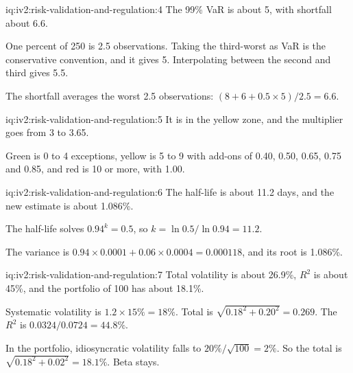 \begin{solution}{iq:iv2:risk-validation-and-regulation:4}
The 99\% VaR is about 5, with shortfall about 6.6.

One percent of 250 is 2.5 observations. Taking the third-worst as VaR is the conservative convention, and it gives 5. Interpolating between the second and third gives 5.5.

The shortfall averages the worst 2.5 observations: $(8 + 6 + 0.5 \times 5)/2.5 = 6.6$.

\end{solution}

\begin{solution}{iq:iv2:risk-validation-and-regulation:5}
It is in the yellow zone, and the multiplier goes from 3 to 3.65.

Green is 0 to 4 exceptions, yellow is 5 to 9 with add-ons of 0.40, 0.50, 0.65, 0.75 and 0.85, and red is 10 or more, with 1.00.

\end{solution}

\begin{solution}{iq:iv2:risk-validation-and-regulation:6}
The half-life is about 11.2 days, and the new estimate is about 1.086\%.

The half-life solves $0.94^k = 0.5$, so $k = \ln 0.5/\ln 0.94 = 11.2$.

The variance is $0.94 \times 0.0001 + 0.06 \times 0.0004 = 0.000118$, and its root is 1.086\%.

\end{solution}

\begin{solution}{iq:iv2:risk-validation-and-regulation:7}
Total volatility is about 26.9\%, $R^2$ is about 45\%, and the portfolio of 100 has about 18.1\%.

Systematic volatility is $1.2 \times 15\% = 18\%$. Total is $\sqrt{0.18^2 + 0.20^2} = 0.269$. The $R^2$ is $0.0324/0.0724 = 44.8\%$.

In the portfolio, idiosyncratic volatility falls to $20\%/\sqrt{100} = 2\%$. So the total is $\sqrt{0.18^2 + 0.02^2} = 18.1\%$. Beta stays.

\end{solution}

